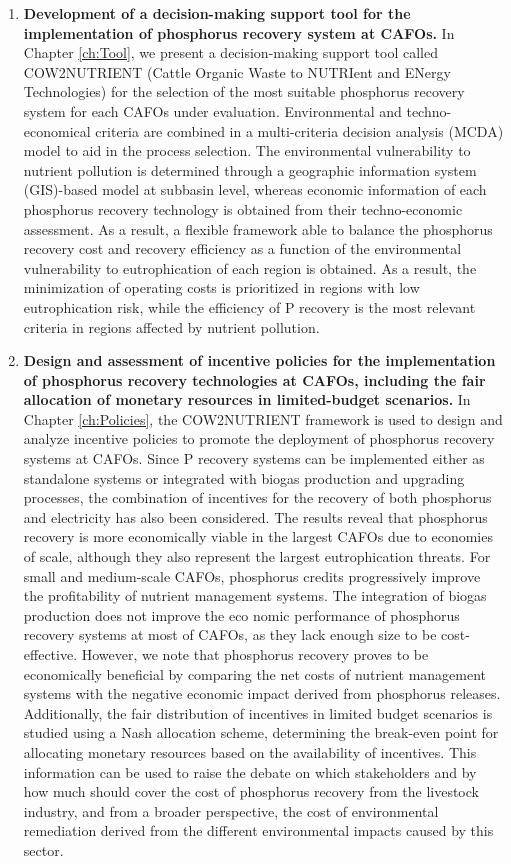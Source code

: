 \begin{enumerate}[font=\bfseries]
	\item \textbf{Development of a decision-making support tool for the implementation of phosphorus recovery system at CAFOs.} In Chapter \ref{ch:Tool}, we present a decision-making support tool called  COW2NUTRIENT (Cattle Organic
	Waste to NUTRIent and ENergy Technologies) for the
	selection of the most suitable phosphorus recovery system for each CAFOs under evaluation. Environmental and techno-economical criteria are combined in a multi-criteria decision analysis
	(MCDA) model to aid in the process selection. The environmental vulnerability to nutrient pollution is determined through a geographic information system (GIS)-based model at subbasin level, whereas economic information of each phosphorus recovery technology is obtained from their techno-economic assessment. As a result, a flexible framework able to balance the phosphorus recovery cost and recovery efficiency as a function of the environmental vulnerability to
	eutrophication of each region is obtained. As a result, the minimization of operating costs is
	prioritized in regions with low eutrophication risk, while the efficiency
	of P recovery is the most relevant criteria in regions affected by nutrient
	pollution.
	
	
	\item \textbf{Design and assessment of incentive policies for the implementation of phosphorus recovery technologies at CAFOs, including the fair allocation of monetary resources in limited-budget scenarios.} In Chapter \ref{ch:Policies}, the COW2NUTRIENT framework is used to design and analyze incentive policies to promote the deployment of phosphorus recovery systems at CAFOs. Since P recovery systems can be implemented either as standalone systems or integrated with biogas production and upgrading processes, the combination of incentives for the recovery	of both phosphorus and electricity has also been considered. The results reveal that phosphorus recovery is more economically viable in the largest CAFOs due to economies of scale, although they also represent the largest eutrophication threats. For small and medium-scale CAFOs, phosphorus credits progressively improve the	profitability of nutrient management systems. The integration of biogas production does not improve the eco­
	nomic performance of phosphorus recovery systems at most of CAFOs, as they lack enough size to be cost-effective. However, we note that phosphorus recovery proves to be economically beneficial by comparing the net costs of nutrient management systems with the negative economic impact derived from phosphorus releases. Additionally, the fair distribution of incentives in limited budget scenarios is studied	using a Nash allocation scheme, determining the break-even point for allocating monetary resources based on the
	availability of incentives. This information can be used to raise the
	debate on which stakeholders and by how much should cover the cost of phosphorus recovery from the livestock industry, and from a broader perspective, the cost of environmental remediation derived from the
	different environmental impacts caused by this sector.
	

\end{enumerate}
